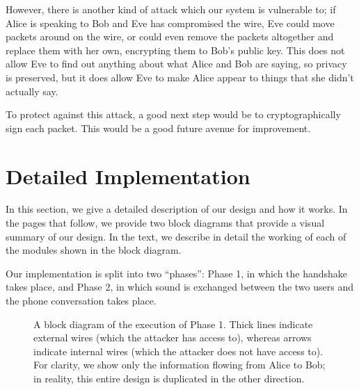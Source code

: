 \documentclass[a4paper]{report}
\begin{document}
However, there is another kind of attack which our system is vulnerable to; if Alice is speaking to Bob and Eve has compromised the wire, Eve could move packets around on the wire, or could even remove the packets altogether and replace them with her own, encrypting them to Bob's public key. This does not allow Eve to find out anything about what Alice and Bob are saying, so privacy is preserved, but it does allow Eve to make Alice appear to things that she didn't actually say.

To protect against this attack, a good next step would be to cryptographically sign each packet. This would be a good future avenue for improvement.

\chapter{Detailed Implementation}

In this section, we give a detailed description of our design and how it works. In the pages that follow, we provide two block diagrams that provide a visual summary of our design. In the text, we describe in detail the working of each of the modules shown in the block diagram.

Our implementation is split into two ``phases'': Phase 1, in which the handshake takes place, and Phase 2, in which sound is exchanged between the two users and the phone conversation takes place.

\begin{figure}
\label{fig3}
\centering \caption{A block diagram of the execution of Phase 1. Thick lines indicate external wires (which the attacker has access to), whereas arrows indicate internal wires (which the attacker does not have access to). For clarity, we show only the information flowing from Alice to Bob; in reality, this entire design is duplicated in the other direction.}
%
\end{figure}
\end{document}
